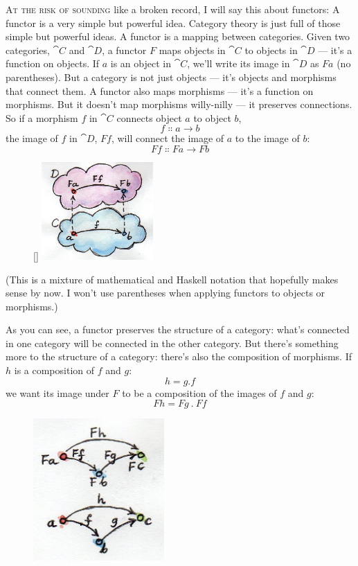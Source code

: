 \lettrine[lhang=0.17]{A}{t the risk of sounding} like a broken record, I will say this about
functors: A functor is a very simple but powerful idea. Category theory
is just full of those simple but powerful ideas. A functor is a mapping
between categories. Given two categories, $\cat{C}$ and $\cat{D}$, a functor $F$ maps
objects in $\cat{C}$ to objects in $\cat{D}$ --- it's a function on objects. If $a$
is an object in $\cat{C}$, we'll write its image in $\cat{D}$ as $F a$ (no
parentheses). But a category is not just objects --- it's objects and
morphisms that connect them. A functor also maps morphisms --- it's a
function on morphisms. But it doesn't map morphisms willy-nilly --- it
preserves connections. So if a morphism $f$ in $\cat{C}$ connects object
$a$ to object $b$,
\[f \Colon a \to b\]
the image of $f$ in $\cat{D}$, $F f$, will connect the image of
$a$ to the image of $b$:
\[F f \Colon F a \to F b\]

\begin{figure}
\raisebox{0pt}[\dimexpr\height]{
\includegraphics[width=42.5mm]{images/functor.jpg}}
\end{figure}

\noindent
(This is a mixture of mathematical and Haskell notation that hopefully
makes sense by now. I won't use parentheses when applying functors to
objects or morphisms.)

\noindent
As you can see, a
functor preserves the structure of a category: what's connected in one
category will be connected in the other category. But there's something
more to the structure of a category: there's also the composition of
morphisms. If $h$ is a composition of $f$ and $g$:
\[h = g . f\]
we want its image under $F$ to be a composition of the images of $f$
and $g$:
\[F h = F g~.~F f\]

\begin{figure}[H]
\centering
\includegraphics[width=50mm]{images/functorcompos.jpg}
\end{figure}

